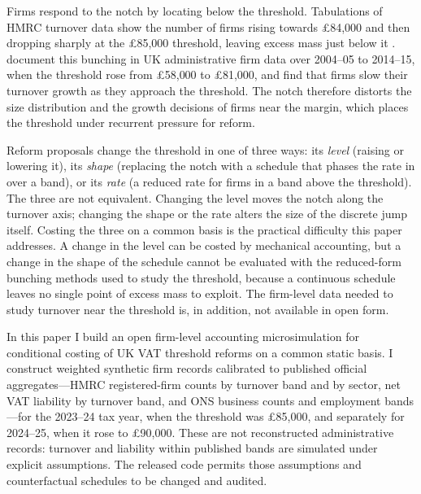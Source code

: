Firms respond to the notch by locating below the threshold. Tabulations of HMRC turnover
data show the number of firms rising towards \pounds 84{,}000 and then dropping sharply at
the \pounds 85{,}000 threshold, leaving excess mass just below it \citep{obr2023vat}.
\citet{liuetal2021} document this bunching in UK administrative firm data over
2004--05 to 2014--15, when the threshold rose from \pounds58{,}000 to
\pounds81{,}000, and \citet{liulockwoodtam2024}
find that firms slow their turnover growth as they approach the threshold. The notch
therefore distorts the size distribution and the growth decisions of firms near the margin,
which places the threshold under recurrent pressure for reform.

Reform proposals change the threshold in one of three ways: its \emph{level} (raising or lowering it), its \emph{shape} (replacing the notch with a schedule that phases the rate in over a band), or its \emph{rate} (a reduced rate for firms in a band above the threshold). The three are not equivalent. Changing the level moves the notch along the turnover axis; changing the shape or the rate alters the size of the discrete jump itself. Costing the three on a common basis is the practical difficulty this paper addresses. A change in the level can be costed by mechanical accounting, but a change in the shape of the schedule cannot be evaluated with the reduced-form bunching methods used to study the threshold, because a continuous schedule leaves no single point of excess mass to exploit. The firm-level data needed to study turnover near the threshold is, in addition, not available in open form.

In this paper I build an open firm-level accounting microsimulation for
conditional costing of UK VAT threshold reforms on a common static basis. I
construct weighted synthetic firm records calibrated to published official
aggregates---HMRC registered-firm counts by turnover band and by sector, net
VAT liability by turnover band, and ONS business counts and employment
bands---for the 2023--24 tax year, when the threshold was \pounds85{,}000,
and separately for 2024--25, when it rose to \pounds90{,}000. These are not
reconstructed administrative records: turnover and liability within published
bands are simulated under explicit assumptions. The released code permits
those assumptions and counterfactual schedules to be changed and audited.

